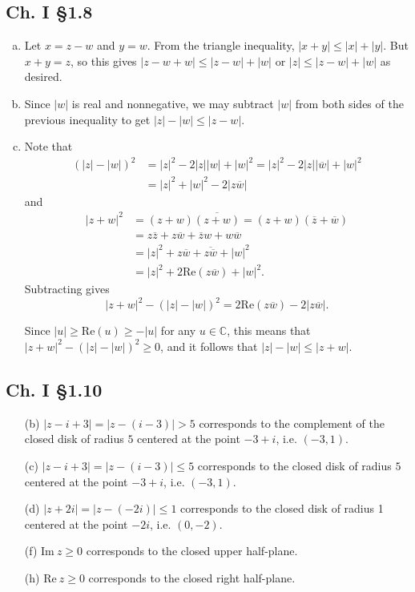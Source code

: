 \documentclass{article}
\begin{document}
\subsection*{Ch. I \S 1.8}
\begin{enumerate}[(a)]
  \item{
    Let $x = z - w$ and $y = w$. From the triangle inequality,
    $|x + y| \leq |x| + |y|$. But $x + y = z$, so this gives
    $|z - w + w| \leq |z - w| + |w|$ or $|z| \leq |z - w| + |w|$ as
    desired.
  }
  \item{
    Since $|w|$ is real and nonnegative, we may subtract $|w|$ from
    both sides of the previous inequality to get $|z| - |w| \leq |z - w|$.
  }
  \item{
    Note that
    \begin{align*}
       (|z| - |w|)^2
    &= |z|^2 - 2 |z| |w| + |w|^2
     = |z|^2 - 2 |z| |\overline{w}| + |w|^2 \\
    &= |z|^2 + |w|^2 - 2|z \overline{w}|
    \end{align*}
    and
    \begin{align*}
          |z + w|^2
    &=    (z + w)\overline{(z + w)}
     =    (z + w)(\overline{z} + \overline{w}) \\
    &=    z \overline{z} + z \overline{w} + \overline{z} w + w \overline{w} \\
    &=    |z|^2 + z \overline{w} + \overline{z \overline{w}} + |w|^2 \\
    &=    |z|^2 + 2 \mathrm{Re}(z \overline{w}) + |w|^2.
    \end{align*}
    Subtracting gives
    $$
    |z + w|^2 - (|z| - |w|)^2 = 2 \mathrm{Re}(z \overline{w}) - 2|z \overline{w}|.
    $$

    Since $|u| \geq \mathrm{Re}(u) \geq -|u|$ for any $u \in \mathbb{C}$,
    this means that $|z + w|^2 - (|z| - |w|)^2 \geq 0$, and it follows that
    $|z| - |w| \leq |z + w|$.
  }
\end{enumerate}

\subsection*{Ch. I \S 1.10}
\begin{itemize}
  \item[(b)]
  {
    $|z - i + 3| = |z - (i - 3)| > 5$ corresponds to the complement of
    the closed disk of radius $5$ centered at the point $-3 + i$,
    i.e. $(-3, 1)$.
  }
  \item[(c)]
  {
    $|z - i + 3| = |z - (i - 3)| \leq 5$ corresponds to the closed
    disk of radius $5$ centered at the point $-3 + i$, i.e. $(-3, 1)$.
  }
  \item[(d)]
  {
    $|z + 2i| = |z - (-2i)| \leq 1$ corresponds to the closed disk of
    radius 1 centered at the point $-2i$, i.e. $(0, -2)$.
  }
  \item[(f)]
  {
    $\mathrm{Im}~z \geq 0$ corresponds to the closed upper half-plane.
  }
  \item[(h)]
  {
    $\mathrm{Re}~z \geq 0$ corresponds to the closed right half-plane.
  }
\end{itemize}
\end{document}
